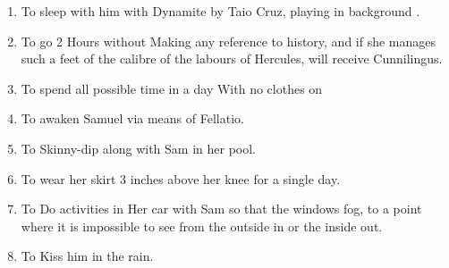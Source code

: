 \begin{enumerate}
\item  To sleep with him with Dynamite by Taio Cruz, playing in background .

\item  To go 2 Hours without Making any reference to history, and if she manages such a feet of the calibre of the labours of Hercules, will receive Cunnilingus. 

\item  To spend all possible time in a day With no clothes on

\item  To awaken Samuel via means of Fellatio.

\item  To Skinny-dip along with Sam in her pool.

\item  To wear her skirt 3 inches above her knee for a single day.

\item  To Do activities in Her car with Sam so that the windows fog, to a point where it is impossible to see from the outside in or the inside out.

\item  To Kiss him in the rain.
\end{enumerate}
